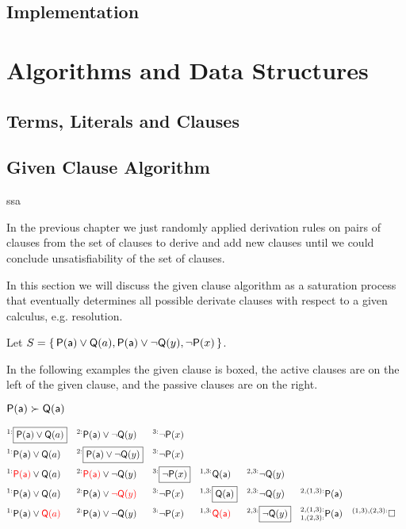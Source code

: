 
\section{Implementation}

\chapter{Algorithms and Data Structures}

\section{Terms, Literals and Clauses}




\section{Given Clause Algorithm}ssa

In the previous chapter we just randomly applied derivation rules
on pairs of clauses from the set of clauses 
to derive and add new clauses 
until we could conclude unsatisfiability of the set of clauses.

In this section we will discuss the given clause algorithm 
as a saturation process that eventually determines all possible derivate clauses
with respect to a given calculus, e.g. resolution.


Let $S=\{\, {\mathsf P}({\mathsf a})\lor{\mathsf Q}(a), {\mathsf P}({\mathsf a})\lor\lnot{\mathsf Q}(y), \lnot{\mathsf P}(x) \,\}$.

In the following examples the given clause is boxed, 
the active clauses are on the left of the given clause, 
and the passive clauses are on the right.

\begin{example} ${\mathsf P}({\mathsf a})\succ{\mathsf Q}({\mathsf a})$
	
	\begin{align*}
	^{1:}&\boxed{\mP(\ma)\lor\mQ(a)} & ^{2:}&\mP(\ma)\lor\lnot\mQ(y) & ^{3:}&\lnot\mP(x) 
	\\
	^{1:}&\mP(\ma)\lor\mQ(a) & ^{2:}&\boxed{\mP(\ma)\lor\lnot\mQ(y)} & ^{3:}&\lnot\mP(x) 
	\\
	^{1:}&{\colLo\mP(\ma)}\lor\mQ(a) & ^{2:}&{\colLo\mP(\ma)}\lor\lnot\mQ(y) & ^{3:}&\boxed{\lnot\mP(x)} 
	& ^{1,3:}&\mQ(\ma) & ^{2,3:}&\lnot\mQ(y)
	\\
	^{1:}&\mP(\ma)\lor\mQ(a) & ^{2:}&\mP(\ma)\lor{\colLo\lnot\mQ(y)} & ^{3:}&\lnot\mP(x)
	& ^{1,3:}&\boxed{\mQ(\ma)} & ^{2,3:}&\lnot\mQ(y) & ^{2,(1,3):}&\mP(\ma)
	\\
	^{1:}&\mP(\ma)\lor{\colLo\mQ(a)} & ^{2:}&\mP(\ma)\lor\lnot\mQ(y) & ^{3:}&\lnot\mP(x)
	& ^{1,3:}&\colLo\mQ(\ma) & ^{2,3:}&\boxed{\lnot\mQ(y)} & ^{2,(1,3):}_{1,(2,3):}&\mP(\ma)
	& ^{(1,3),(2,3):}&\emptyclause
	\\
	\end{align*}
\end{example}

